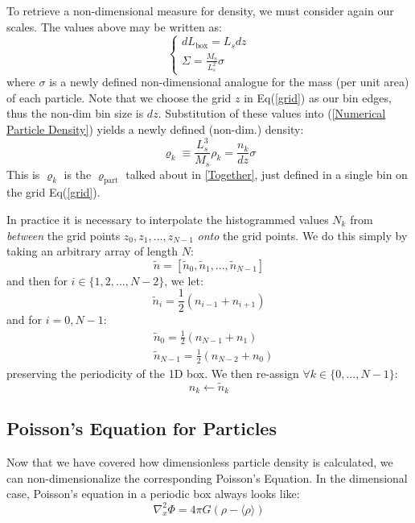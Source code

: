 \documentclass[oneside]{book}
\begin{document}
To retrieve a non-dimensional measure for density, we must consider again our scales. The values above may be written as:
\begin{equation*}
    \begin{cases}
    d L_\text{box} = L_s dz \\
    \Sigma = \frac{M_s}{L_s^2} \sigma
    \end{cases}
\end{equation*}
where $\sigma$ is a newly defined non-dimensional analogue for the mass (per unit area) of each particle. Note that we choose the grid $z$ in Eq(\ref{grid}) as our bin edges, thus the non-dim bin size is $dz$. Substitution of these values into (\ref{Numerical Particle Density}) yields a newly defined (non-dim.) density:
\begin{equation}
    \varrho_k \equiv \frac{L_s^3}{M_s} \rho_k = \frac{n_k}{dz}\sigma
    \label{varrho_part}
\end{equation}
This is $\varrho_k$ is the $\varrho_\text{part}$ talked about in \cref{Together}, just defined in a single bin on the grid Eq(\ref{grid}). 

In practice it is necessary to interpolate the histogrammed values $N_k$ from \textit{between} the grid points $z_0,z_1,...,z_{N-1}$ \textit{onto} the grid points. We do this simply by taking an arbitrary array of length $N$: 
$$\tilde{n} = [\tilde{n}_0, \tilde{n}_1, ..., \tilde{n}_{N-1}]$$
and then for $i \in \{1,2,...,N-2\}$, we let:
$$\tilde{n}_i = \frac{1}{2}(n_{i-1}+n_{i+1})$$
and for $i=0,N-1$:
\begin{align*}
    & \tilde{n}_0 = \frac{1}{2}(n_{N-1} + n_1) \\
    & \tilde{n}_{N-1} = \frac{1}{2}(n_{N-2} + n_0)
\end{align*}
preserving the periodicity of the 1D box. We then re-assign $\forall k \in \{0,...,N-1\}$:
$$n_k \leftarrow \tilde{n}_k $$

\subsection{Poisson's Equation for Particles}\label{Poisson's Equation for Particles}
Now that we have covered how dimensionless particle density is calculated, we can non-dimensionalize the corresponding Poisson's Equation. In the dimensional case, Poisson's equation in a periodic box always looks like:
\begin{equation*}
    \nabla_x^2 \Phi = 4\pi G (\rho - \langle \rho \rangle) 
\end{equation*}
\end{document}
